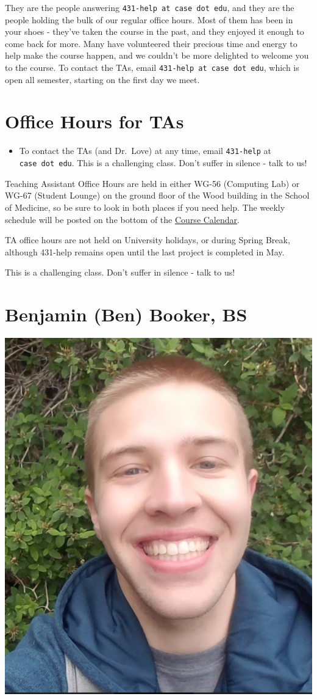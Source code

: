 \documentclass[
]{book}
\providecommand{\tightlist}{%
  \setlength{\itemsep}{0pt}\setlength{\parskip}{0pt}}
\begin{document}
They are the people answering \texttt{431-help\ at\ case\ dot\ edu}, and they are the people holding the bulk of our regular office hours. Most of them has been in your shoes - they've taken the course in the past, and they enjoyed it enough to come back for more. Many have volunteered their precious time and energy to help make the course happen, and we couldn't be more delighted to welcome you to the course. To contact the TAs, email \texttt{431-help\ at\ case\ dot\ edu}, which is open all semester, starting on the first day we meet.

\hypertarget{office-hours-for-tas}{%
\section{Office Hours for TAs}\label{office-hours-for-tas}}

\begin{itemize}
\tightlist
\item
  To contact the TAs (and Dr.~Love) at any time, email \texttt{431-help} at \texttt{case\ dot\ edu}. This is a challenging class. Don't suffer in silence - talk to us!
\end{itemize}

Teaching Assistant Office Hours are held in either WG-56 (Computing Lab) or WG-67 (Student Lounge) on the ground floor of the Wood building in the School of Medicine, so be sure to look in both places if you need help. The weekly schedule will be posted on the bottom of the \href{https://github.com/THOMASELOVE/2020-432/blob/master/calendar.md}{Course Calendar}.

TA office hours are not held on University holidays, or during Spring Break, although 431-help remains open until the last project is completed in May.

This is a challenging class. Don't suffer in silence - talk to us!

\hypertarget{benjamin-ben-booker-bs}{%
\section{Benjamin (Ben) Booker, BS}\label{benjamin-ben-booker-bs}}

\includegraphics[width=0.3\linewidth]{figures/Ben}
\end{document}
